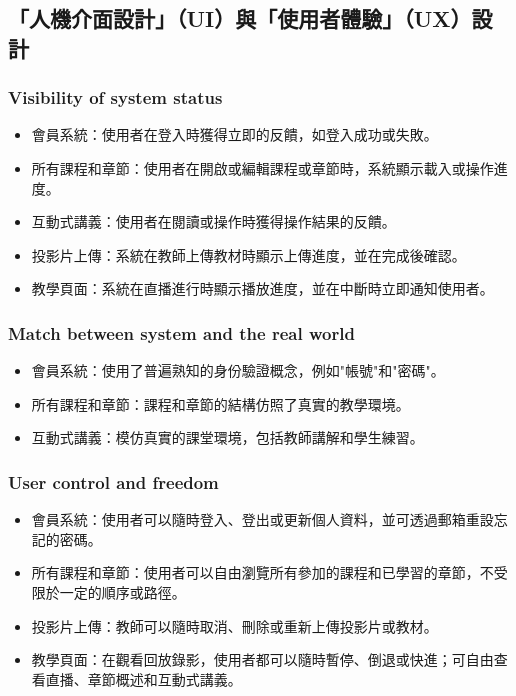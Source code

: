 \documentclass[12pt]{article}
\begin{document}
\subsection{「人機介面設計」（UI）與「使用者體驗」（UX）設計}

\subsubsection{Visibility of system status}

\begin{itemize}
  \item 會員系統：使用者在登入時獲得立即的反饋，如登入成功或失敗。
  \item 所有課程和章節：使用者在開啟或編輯課程或章節時，系統顯示載入或操作進度。
  \item 互動式講義：使用者在閱讀或操作時獲得操作結果的反饋。
  \item 投影片上傳：系統在教師上傳教材時顯示上傳進度，並在完成後確認。
  \item 教學頁面：系統在直播進行時顯示播放進度，並在中斷時立即通知使用者。
\end{itemize}

\subsubsection{Match between system and the real world}

\begin{itemize}
  \item 會員系統：使用了普遍熟知的身份驗證概念，例如"帳號"和"密碼"。
  \item 所有課程和章節：課程和章節的結構仿照了真實的教學環境。
  \item 互動式講義：模仿真實的課堂環境，包括教師講解和學生練習。
\end{itemize}

\subsubsection{User control and freedom}

\begin{itemize}
  \item 會員系統：使用者可以隨時登入、登出或更新個人資料，並可透過郵箱重設忘記的密碼。
  \item 所有課程和章節：使用者可以自由瀏覽所有參加的課程和已學習的章節，不受限於一定的順序或路徑。
  \item 投影片上傳：教師可以隨時取消、刪除或重新上傳投影片或教材。
  \item 教學頁面：在觀看回放錄影，使用者都可以隨時暫停、倒退或快進；可自由查看直播、章節概述和互動式講義。
\end{itemize}
\end{document}
